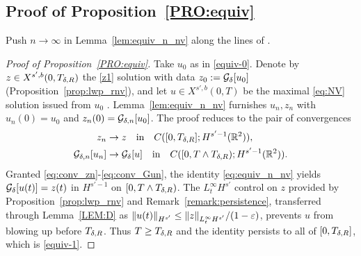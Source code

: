 \subsection{Proof of Proposition~\ref{PRO:equiv}}

Push $n\to\infty$ in Lemma~\ref{lem:equiv_n_nv} along the lines of
\cite[Proof of Proposition~5.6]{chcora}.

\begin{proof}[Proof of Proposition~\textup{\ref{PRO:equiv}}]
Take $u_0$ as in \eqref{equiv-0}. Denote by
$z\in X^{s',b}(0,T_{\delta,R})$ the \eqref{z1} solution with data
$z_0:=\mathcal{G}_\delta[u_0]$ (Proposition~\ref{prop:lwp_rnv}), and let
$u\in X^{s',b}(0,T)$ be the maximal \eqref{eq:NV} solution issued
from $u_0$
\cite{angelopolous,kazeykinamunoz1,kazeykinamunoz2}. Lemma~\ref{lem:equiv_n_nv}
furnishes $u_n,z_n$ with $u_n(0)=u_0$ and
$z_n(0)=\mathcal{G}_{\delta,n}[u_0]$. The proof reduces to the pair of
convergences
\begin{align}
\label{eq:conv_zn}
z_n &\to z \quad\text{in}\quad C([0,T_{\delta,R}]; H^{s'-1}(\mathbb{R}^2)),
\\
\label{eq:conv_Gun}
\mathcal{G}_{\delta,n}[u_n] &\to \mathcal{G}_\delta[u]
\quad\text{in}\quad C([0,T\wedge T_{\delta,R}); H^{s'-1}(\mathbb{R}^2)).
\end{align}
Granted \eqref{eq:conv_zn}-\eqref{eq:conv_Gun}, the identity
\eqref{eq:equiv_n_nv} yields $\mathcal{G}_\delta[u(t)]=z(t)$ in $H^{s'-1}$ on
$[0,T\wedge T_{\delta,R})$. The $L^\infty_t H^{s'}$ control on $z$
provided by Proposition~\ref{prop:lwp_rnv} and
Remark~\ref{remark:persistence}, transferred through
Lemma~\ref{LEM:D} as
$\|u(t)\|_{H^{s'}}\le \|z\|_{L^\infty_t H^{s'}}/(1-\varepsilon)$,
prevents $u$ from blowing up before $T_{\delta,R}$. Thus
$T\ge T_{\delta,R}$ and the identity persists to all of
$[0,T_{\delta,R}]$, which is \eqref{equiv-1}.


\end{proof}
